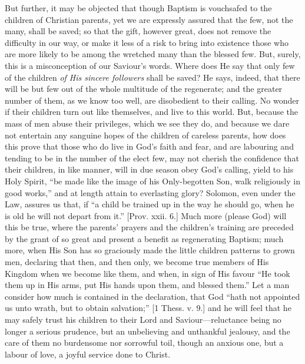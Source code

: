 But further, it may be objected that though Baptism is vouchsafed
to the children of Christian parents, yet we are expressly assured
that the few, not the many, shall be saved; so that the gift, however
great, does not remove the difficulty in our way, or make it less of a
risk to bring into existence those who are more likely to be among the
wretched many than the blessed few. But, surely, this is a
misconception of our Saviour's words. Where does He say that only
few of the children \emph{of His sincere followers} shall be saved? He
says, indeed, that there will be but few out of the whole multitude of
the regenerate; and the greater number of them, as we know too well,
are disobedient to their calling. No wonder if their children turn out
like themselves, and live to this world. But, because the mass of men
abuse their privileges, which we see they do, and because we dare not
entertain any sanguine hopes of the children of careless parents, how
does this prove that those who do live in God's faith and fear, and
are labouring and tending to be in the number of the elect few, may
not cherish the confidence that their children, in like manner, will
in due season obey God's calling, yield to his Holy Spirit, ``be
made like the image of his Only-begotten Son, walk religiously in good
works,'' and at length attain to everlasting glory? Solomon, even
under the Law, assures us that, if ``a child be trained up in the
way he should go, when he is old he will not depart from it.'' [Prov.
xxii. 6.] Much more (please God) will this be true, where the parents'
prayers and the children's training are preceded by the grant of so
great and present a benefit as regenerating Baptism; much more, when
His Son has so graciously made the little children patterns to grown
men, declaring that then, and then only, we become true members of His
Kingdom when we become like them, and when, in sign of His favour
``He took them up in His arms, put His hands upon them, and
blessed them.'' Let a man consider how much is contained in the
declaration, that God ``hath not appointed us unto wrath, but to
obtain salvation;'' [1 Thess. v. 9.] and he will feel that he may
safely trust his children to their Lord and Saviour—reluctance being
no longer a serious prudence, but an unbelieving and unthankful
jealousy, and the care of them no burdensome nor sorrowful toil,
though an anxious one, but a labour of love, a joyful service done to
Christ.

